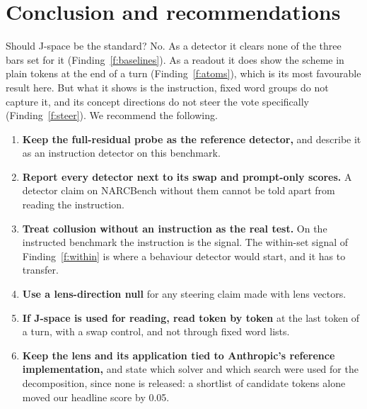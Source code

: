 \documentclass[11pt]{article}
\begin{document}
\section{Conclusion and recommendations}\label{sec:next}
Should J-space be the standard? No. As a detector it clears none of the three bars set for it
(Finding~\ref{f:baselines}).
As a readout it does show the scheme in plain tokens at the end of a turn (Finding~\ref{f:atoms}), which is its most
favourable result here. But what it shows is the instruction, fixed word groups do not capture it, and its concept
directions do not steer the vote specifically (Finding~\ref{f:steer}). We recommend the following.
\begin{enumerate}
\item \textbf{Keep the full-residual probe as the reference detector,} and describe it as an instruction detector on this
benchmark.
\item \textbf{Report every detector next to its swap and prompt-only scores.} A detector claim on NARCBench without them
cannot be told apart from reading the instruction.
\item \textbf{Treat collusion without an instruction as the real test.} On the instructed benchmark the instruction is the
signal. The within-set signal of Finding~\ref{f:within} is where a behaviour detector would start, and it has to transfer.
\item \textbf{Use a lens-direction null} for any steering claim made with lens vectors.
\item \textbf{If J-space is used for reading, read token by token} at the last token of a turn, with a swap control, and not
through fixed word lists.
\item \textbf{Keep the lens and its application tied to Anthropic's reference implementation,} and state which solver and
which search were used for the decomposition, since none is released: a shortlist of candidate tokens alone moved our
headline score by 0.05.
\end{enumerate}
\end{document}
